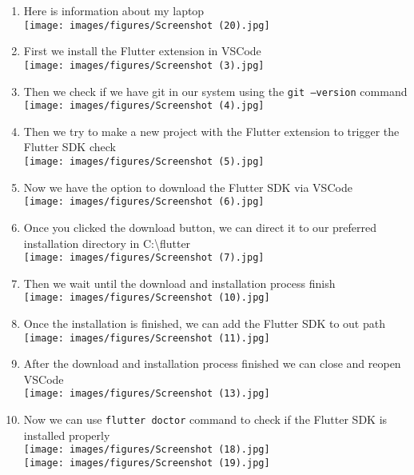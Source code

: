 \documentclass[12pt,titlepage]{article}
\begin{document}
\begin{enumerate}
    \item Here is information about my laptop \\ \texttt{[image: images/figures/Screenshot (20).jpg]}
    \item First we install the Flutter extension in VSCode \\ \texttt{[image: images/figures/Screenshot (3).jpg]}
    \newpage
    \item Then we check if we have git in our system using the \texttt{git --version} command \\ \texttt{[image: images/figures/Screenshot (4).jpg]}
    \item Then we try to make a new project with the Flutter extension to trigger the Flutter SDK check \\ \texttt{[image: images/figures/Screenshot (5).jpg]}
    \newpage
    \item Now we have the option to download the Flutter SDK via VSCode \\ \texttt{[image: images/figures/Screenshot (6).jpg]}
    \item Once you clicked the download button, we can direct it to our preferred installation directory in C:\textbackslash flutter \\ \texttt{[image: images/figures/Screenshot (7).jpg]}
    \newpage
    \item Then we wait until the download and installation process finish \\ \texttt{[image: images/figures/Screenshot (10).jpg]}
    \item Once the installation is finished, we can add the Flutter SDK to out path \\ \texttt{[image: images/figures/Screenshot (11).jpg]}
    \newpage
    \item After the download and installation process finished we can close and reopen VSCode \\ \texttt{[image: images/figures/Screenshot (13).jpg]}
    \newpage
    \item Now we can use \texttt{flutter doctor} command to check if the Flutter SDK is installed properly \\ \texttt{[image: images/figures/Screenshot (18).jpg]} \\ \texttt{[image: images/figures/Screenshot (19).jpg]}

\end{enumerate}
\end{document}

